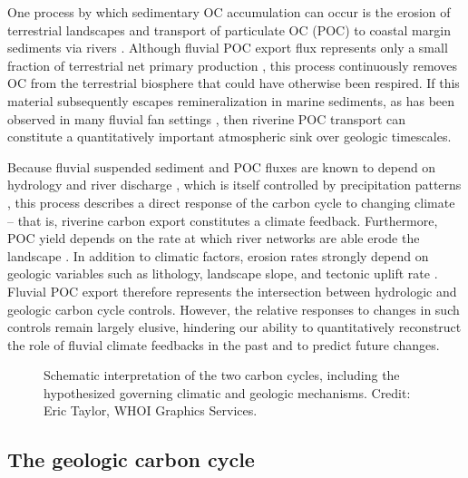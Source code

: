 One process by which sedimentary OC accumulation can occur is the erosion of terrestrial landscapes and transport of particulate OC (POC) to coastal margin sediments via rivers \citep{Ludwig:1996ul,Schlunz:2000tl}. Although fluvial POC export flux represents only a small fraction of terrestrial net primary production \citep[\textit{i.e.} $\leq 1$\%;][]{Galy:2015fx}, this process continuously removes OC from the terrestrial biosphere that could have otherwise been respired. If this material subsequently escapes remineralization in marine sediments, as has been observed in many fluvial fan settings \citep{Derry:1996um,Burdige:2005tr,Galy:2007ev,Hilton:2008fo}, then riverine POC transport can constitute a quantitatively important atmospheric  sink over geologic timescales. 

Because fluvial suspended sediment and POC fluxes are known to depend on hydrology and river discharge \citep{Milliman:2011ug}, which is itself controlled by precipitation patterns \citep[\textit{e.g.}][]{Jian:2009bz}, this process describes a direct response of the carbon cycle to changing climate -- that is, riverine carbon export constitutes a climate feedback. Furthermore, POC yield depends on the rate at which river networks are able erode the landscape \citep{Ludwig:1996ul,Ludwig:1998ud,Galy:2015fx}. In addition to climatic factors, erosion rates strongly depend on geologic variables such as lithology, landscape slope, and tectonic uplift rate \citep{Dadson:2003kl,Milliman:2011ug,Hilton:2016dz}. Fluvial POC export therefore represents the intersection between hydrologic and geologic carbon cycle controls. However, the relative responses to changes in such controls remain largely elusive, hindering our ability to quantitatively reconstruct the role of fluvial climate feedbacks in the past and to predict future changes.

\begin{figure}[t]
	\caption[Schematic representation of Earth's two carbon cycles]{Schematic interpretation of the two carbon cycles, including the hypothesized governing climatic and geologic mechanisms. Credit: Eric Taylor, WHOI Graphics Services.}
	\label{Ch1Fig:2}
\end{figure}

\subsection{The geologic carbon cycle}

